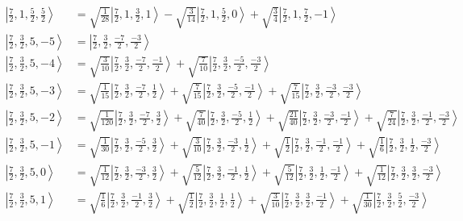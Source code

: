 \documentclass{report}
\newcommand{\ket}[1]{\left| #1 \right>} %
\begin{document}
\begin{align*}
\ket{ \frac{7}{2} ,  1 ,  \frac{5}{2} ,  \frac{5}{2}  } &=  \sqrt{  \frac{1}{28}  } \ket{ \frac{7}{2} ,  1 ,  \frac{3}{2} ,  1  } - \sqrt{  \frac{3}{14}  } \ket{ \frac{7}{2} ,  1 ,  \frac{5}{2} ,  0  } + \sqrt{  \frac{3}{4}  } \ket{ \frac{7}{2} ,  1 ,  \frac{7}{2} ,  -1  } \\
\ket{ \frac{7}{2} ,  \frac{3}{2} ,  5 ,  -5  } &=  \ket{ \frac{7}{2} ,  \frac{3}{2} ,  \frac{-7}{2} ,  \frac{-3}{2}  } \\
\ket{ \frac{7}{2} ,  \frac{3}{2} ,  5 ,  -4  } &=  \sqrt{  \frac{3}{10}  } \ket{ \frac{7}{2} ,  \frac{3}{2} ,  \frac{-7}{2} ,  \frac{-1}{2}  } + \sqrt{  \frac{7}{10}  } \ket{ \frac{7}{2} ,  \frac{3}{2} ,  \frac{-5}{2} ,  \frac{-3}{2}  } \\
\ket{ \frac{7}{2} ,  \frac{3}{2} ,  5 ,  -3  } &=  \sqrt{  \frac{1}{15}  } \ket{ \frac{7}{2} ,  \frac{3}{2} ,  \frac{-7}{2} ,  \frac{1}{2}  } + \sqrt{  \frac{7}{15}  } \ket{ \frac{7}{2} ,  \frac{3}{2} ,  \frac{-5}{2} ,  \frac{-1}{2}  } + \sqrt{  \frac{7}{15}  } \ket{ \frac{7}{2} ,  \frac{3}{2} ,  \frac{-3}{2} ,  \frac{-3}{2}  } \\
\ket{ \frac{7}{2} ,  \frac{3}{2} ,  5 ,  -2  } &=  \sqrt{  \frac{1}{120}  } \ket{ \frac{7}{2} ,  \frac{3}{2} ,  \frac{-7}{2} ,  \frac{3}{2}  } + \sqrt{  \frac{7}{40}  } \ket{ \frac{7}{2} ,  \frac{3}{2} ,  \frac{-5}{2} ,  \frac{1}{2}  } + \sqrt{  \frac{21}{40}  } \ket{ \frac{7}{2} ,  \frac{3}{2} ,  \frac{-3}{2} ,  \frac{-1}{2}  } + \sqrt{  \frac{7}{24}  } \ket{ \frac{7}{2} ,  \frac{3}{2} ,  \frac{-1}{2} ,  \frac{-3}{2}  } \\
\ket{ \frac{7}{2} ,  \frac{3}{2} ,  5 ,  -1  } &=  \sqrt{  \frac{1}{30}  } \ket{ \frac{7}{2} ,  \frac{3}{2} ,  \frac{-5}{2} ,  \frac{3}{2}  } + \sqrt{  \frac{3}{10}  } \ket{ \frac{7}{2} ,  \frac{3}{2} ,  \frac{-3}{2} ,  \frac{1}{2}  } + \sqrt{  \frac{1}{2}  } \ket{ \frac{7}{2} ,  \frac{3}{2} ,  \frac{-1}{2} ,  \frac{-1}{2}  } + \sqrt{  \frac{1}{6}  } \ket{ \frac{7}{2} ,  \frac{3}{2} ,  \frac{1}{2} ,  \frac{-3}{2}  } \\
\ket{ \frac{7}{2} ,  \frac{3}{2} ,  5 ,  0  } &=  \sqrt{  \frac{1}{12}  } \ket{ \frac{7}{2} ,  \frac{3}{2} ,  \frac{-3}{2} ,  \frac{3}{2}  } + \sqrt{  \frac{5}{12}  } \ket{ \frac{7}{2} ,  \frac{3}{2} ,  \frac{-1}{2} ,  \frac{1}{2}  } + \sqrt{  \frac{5}{12}  } \ket{ \frac{7}{2} ,  \frac{3}{2} ,  \frac{1}{2} ,  \frac{-1}{2}  } + \sqrt{  \frac{1}{12}  } \ket{ \frac{7}{2} ,  \frac{3}{2} ,  \frac{3}{2} ,  \frac{-3}{2}  } \\
\ket{ \frac{7}{2} ,  \frac{3}{2} ,  5 ,  1  } &=  \sqrt{  \frac{1}{6}  } \ket{ \frac{7}{2} ,  \frac{3}{2} ,  \frac{-1}{2} ,  \frac{3}{2}  } + \sqrt{  \frac{1}{2}  } \ket{ \frac{7}{2} ,  \frac{3}{2} ,  \frac{1}{2} ,  \frac{1}{2}  } + \sqrt{  \frac{3}{10}  } \ket{ \frac{7}{2} ,  \frac{3}{2} ,  \frac{3}{2} ,  \frac{-1}{2}  } + \sqrt{  \frac{1}{30}  } \ket{ \frac{7}{2} ,  \frac{3}{2} ,  \frac{5}{2} ,  \frac{-3}{2}  } \\

\end{align*}
\end{document}
